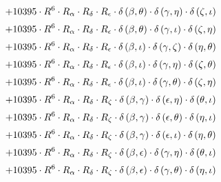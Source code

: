 \begin{subequations}
\begin{gather}
 \\[0.2em] \notag 		 + 10395 \cdot R^{6} \cdot R_{\alpha{}} \cdot R_{\delta{}} \cdot R_{\epsilon{}} \cdot \delta{}\left(\beta{}, \theta{}\right) \cdot \delta{}\left(\gamma{}, \eta{}\right) \cdot \delta{}\left(\zeta{}, \iota{}\right) 
 \\[0.2em] \notag 		 + 10395 \cdot R^{6} \cdot R_{\alpha{}} \cdot R_{\delta{}} \cdot R_{\epsilon{}} \cdot \delta{}\left(\beta{}, \theta{}\right) \cdot \delta{}\left(\gamma{}, \iota{}\right) \cdot \delta{}\left(\zeta{}, \eta{}\right) 
 \\[0.2em] \notag 		 + 10395 \cdot R^{6} \cdot R_{\alpha{}} \cdot R_{\delta{}} \cdot R_{\epsilon{}} \cdot \delta{}\left(\beta{}, \iota{}\right) \cdot \delta{}\left(\gamma{}, \zeta{}\right) \cdot \delta{}\left(\eta{}, \theta{}\right) 
 \\[0.2em] \notag 		 + 10395 \cdot R^{6} \cdot R_{\alpha{}} \cdot R_{\delta{}} \cdot R_{\epsilon{}} \cdot \delta{}\left(\beta{}, \iota{}\right) \cdot \delta{}\left(\gamma{}, \eta{}\right) \cdot \delta{}\left(\zeta{}, \theta{}\right) 
 \\[0.2em] \notag 		 + 10395 \cdot R^{6} \cdot R_{\alpha{}} \cdot R_{\delta{}} \cdot R_{\epsilon{}} \cdot \delta{}\left(\beta{}, \iota{}\right) \cdot \delta{}\left(\gamma{}, \theta{}\right) \cdot \delta{}\left(\zeta{}, \eta{}\right) 
 \\[0.2em] \notag 		 + 10395 \cdot R^{6} \cdot R_{\alpha{}} \cdot R_{\delta{}} \cdot R_{\zeta{}} \cdot \delta{}\left(\beta{}, \gamma{}\right) \cdot \delta{}\left(\epsilon{}, \eta{}\right) \cdot \delta{}\left(\theta{}, \iota{}\right) 
 \\[0.2em] \notag 		 + 10395 \cdot R^{6} \cdot R_{\alpha{}} \cdot R_{\delta{}} \cdot R_{\zeta{}} \cdot \delta{}\left(\beta{}, \gamma{}\right) \cdot \delta{}\left(\epsilon{}, \theta{}\right) \cdot \delta{}\left(\eta{}, \iota{}\right) 
 \\[0.2em] \notag 		 + 10395 \cdot R^{6} \cdot R_{\alpha{}} \cdot R_{\delta{}} \cdot R_{\zeta{}} \cdot \delta{}\left(\beta{}, \gamma{}\right) \cdot \delta{}\left(\epsilon{}, \iota{}\right) \cdot \delta{}\left(\eta{}, \theta{}\right) 
 \\[0.2em] \notag 		 + 10395 \cdot R^{6} \cdot R_{\alpha{}} \cdot R_{\delta{}} \cdot R_{\zeta{}} \cdot \delta{}\left(\beta{}, \epsilon{}\right) \cdot \delta{}\left(\gamma{}, \eta{}\right) \cdot \delta{}\left(\theta{}, \iota{}\right) 
 \\[0.2em] \notag 		 + 10395 \cdot R^{6} \cdot R_{\alpha{}} \cdot R_{\delta{}} \cdot R_{\zeta{}} \cdot \delta{}\left(\beta{}, \epsilon{}\right) \cdot \delta{}\left(\gamma{}, \theta{}\right) \cdot \delta{}\left(\eta{}, \iota{}\right) 

\end{gather}
\end{subequations}
